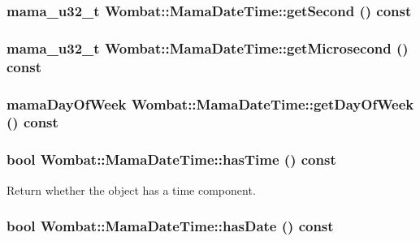 \label{classWombat_1_1MamaDateTime_af910e4dc528a9d49b6515cf6d58d8362}
\hypertarget{classWombat_1_1MamaDateTime_ab65d2b7e006e89927bbb923237e354b8}{
\subsubsection[{getSecond}]{\setlength{\rightskip}{0pt plus 5cm}mama\_\-u32\_\-t Wombat::MamaDateTime::getSecond () const}}
\label{classWombat_1_1MamaDateTime_ab65d2b7e006e89927bbb923237e354b8}
\hypertarget{classWombat_1_1MamaDateTime_a35248ae77e516d88d86b32de9f6697df}{
\subsubsection[{getMicrosecond}]{\setlength{\rightskip}{0pt plus 5cm}mama\_\-u32\_\-t Wombat::MamaDateTime::getMicrosecond () const}}
\label{classWombat_1_1MamaDateTime_a35248ae77e516d88d86b32de9f6697df}
\hypertarget{classWombat_1_1MamaDateTime_aefb6a536ee7225e86d5f0802cc5514ce}{
\subsubsection[{getDayOfWeek}]{\setlength{\rightskip}{0pt plus 5cm}mamaDayOfWeek Wombat::MamaDateTime::getDayOfWeek () const}}
\label{classWombat_1_1MamaDateTime_aefb6a536ee7225e86d5f0802cc5514ce}
\hypertarget{classWombat_1_1MamaDateTime_adda7ed3aad76e13cc020e89c24f54b0d}{
\subsubsection[{hasTime}]{\setlength{\rightskip}{0pt plus 5cm}bool Wombat::MamaDateTime::hasTime () const}}
\label{classWombat_1_1MamaDateTime_adda7ed3aad76e13cc020e89c24f54b0d}


Return whether the object has a time component. \hypertarget{classWombat_1_1MamaDateTime_a670f5d49b9eae47d0a5593df4f7a622d}{
\subsubsection[{hasDate}]{\setlength{\rightskip}{0pt plus 5cm}bool Wombat::MamaDateTime::hasDate () const}}
\label{classWombat_1_1MamaDateTime_a670f5d49b9eae47d0a5593df4f7a622d}


